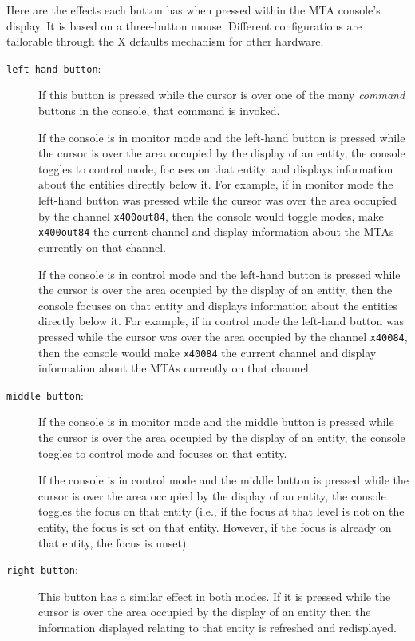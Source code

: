 Here are the effects each button has when pressed within the MTA
console's display. It is based on a three-button mouse. Different
configurations are tailorable through the X defaults mechanism for
other hardware.
\begin{description}
\item[\verb+left hand button+:] If this button is pressed while the
cursor is over one of the many {\em command} buttons in the console,
that command is invoked.

If the console is in monitor mode and the left-hand button is pressed
while the cursor is over the area occupied by the display of an entity,
the console toggles to control mode, focuses on that entity, and
displays information about the entities directly below it.
For example, if in monitor mode the left-hand button was pressed while the
cursor was over the area occupied by the channel \verb+x400out84+,
then the console would toggle modes, make \verb+x400out84+ the current
channel and display information about the MTAs currently on that channel.

If the console is in control mode and the left-hand button is pressed
while the cursor is over the area occupied by the display of an
entity, then the console focuses on that entity and displays
information about the entities directly below it.
For example, if in control mode the left-hand button was pressed while
the cursor was over the area occupied by the channel \verb+x40084+,
then the console would make \verb+x40084+ the current channel and
display information about the MTAs currently on that channel.

\item[\verb+middle button+:] If the console is in monitor mode and the
middle button is pressed while the cursor is over the area occupied by
the display of an entity, the console toggles to control mode and
focuses on that entity.

If the console is in control mode and the middle button is pressed
while the cursor is over the area occupied by the display of an
entity, the console toggles the focus on that entity (i.e., if the focus
at that level is not on the entity, the focus is set on that entity.
However, if the focus is already on that entity, the focus is unset).

\item[\verb+right button+:] This button has a similar effect in both
modes.
If it is pressed while the cursor is over the area occupied by the
display of an entity then the information displayed relating to that
entity is refreshed and redisplayed.
\end{description}

